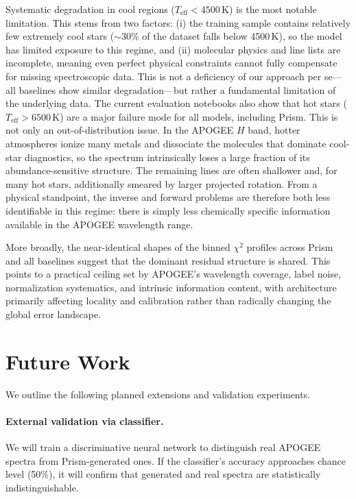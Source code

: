 \documentclass[preprint]{aastex701-1/aastex701}
\begin{document}
Systematic degradation in cool regions ($T_\mathrm{eff} < 4500$\,K) is the most notable
limitation. This stems from two factors: (i) the training sample contains relatively few
extremely cool stars (${\sim}$30\% of the dataset falls below 4500\,K), so the model has
limited exposure to this regime, and (ii) molecular physics and line lists are incomplete,
meaning even perfect physical constraints cannot fully compensate for missing spectroscopic
data. This is not a deficiency of our approach per se---all baselines show similar
degradation---but rather a fundamental limitation of the underlying data. The current
evaluation notebooks also show that hot stars ($T_\mathrm{eff}>6500$\,K) are a major
failure mode for all models, including Prism. This is not only an out-of-distribution
issue. In the APOGEE $H$ band, hotter atmospheres ionize many metals and dissociate the
molecules that dominate cool-star diagnostics, so the spectrum intrinsically loses a large
fraction of its abundance-sensitive structure. The remaining lines are often shallower and,
for many hot stars, additionally smeared by larger projected rotation. From a physical
standpoint, the inverse and forward problems are therefore both less identifiable in this
regime: there is simply less chemically specific information available in the APOGEE
wavelength range.

More broadly, the near-identical shapes of the binned $\chi^2$ profiles across Prism and
all baselines suggest that the dominant residual structure is shared. This points to a
practical ceiling set by APOGEE's wavelength coverage, label noise, normalization systematics,
and intrinsic information content, with architecture primarily affecting locality and
calibration rather than radically changing the global error landscape.

\section{Future Work}
\label{sec:future}

We outline the following planned extensions and validation experiments.

\paragraph{External validation via classifier.}
We will train a discriminative neural network to distinguish real APOGEE spectra from
Prism-generated ones. If the classifier's accuracy approaches chance level (50\%), it will
confirm that generated and real spectra are statistically indistinguishable.
\end{document}
